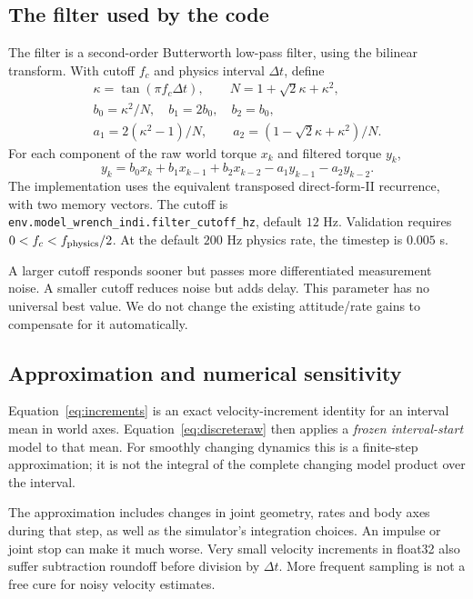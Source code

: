 \documentclass[11pt,a4paper]{article}
\begin{document}
\subsection{The filter used by the code}
The filter is a second-order Butterworth low-pass filter, using the bilinear
transform. With cutoff $f_c$ and physics interval $\Delta t$, define
\begin{equation}
\begin{gathered}
\kappa=\tan(\pi f_c\Delta t),\qquad
N=1+\sqrt2\kappa+\kappa^2,\\
b_0=\kappa^2/N,\quad b_1=2b_0,\quad b_2=b_0,\\
a_1=2(\kappa^2-1)/N,\qquad
a_2=(1-\sqrt2\kappa+\kappa^2)/N.
\end{gathered}\label{eq:coefficients}
\end{equation}
For each component of the raw world torque $x_k$ and filtered torque $y_k$,
\begin{equation}
y_k=b_0x_k+b_1x_{k-1}+b_2x_{k-2}-a_1y_{k-1}-a_2y_{k-2}.
\label{eq:filter}
\end{equation}
The implementation uses the equivalent transposed direct-form-II recurrence,
with two memory vectors. The cutoff is
\texttt{env.model\_wrench\_indi.filter\_cutoff\_hz}, default $12$ Hz.
Validation requires $0<f_c<f_{\rm physics}/2$.
At the default $200$ Hz physics rate, the timestep is $0.005$ s.

A larger cutoff responds sooner but passes more differentiated measurement
noise. A smaller cutoff reduces noise but adds delay. This parameter has no
universal best value. We do not change the existing attitude/rate gains to
compensate for it automatically.

\subsection{Approximation and numerical sensitivity}
Equation~\eqref{eq:increments} is an exact velocity-increment identity for an
interval mean in world axes. Equation~\eqref{eq:discreteraw} then applies a
\emph{frozen interval-start} model to that mean. For smoothly changing dynamics
this is a finite-step approximation; it is not the integral of the complete
changing model product over the interval.

The approximation includes changes in joint geometry, rates and body axes
during that step, as well as the simulator's integration choices. An impulse or
joint stop can make it much worse. Very small velocity increments in float32
also suffer subtraction roundoff before division by $\Delta t$. More frequent
sampling is not a free cure for noisy velocity estimates.
\end{document}
